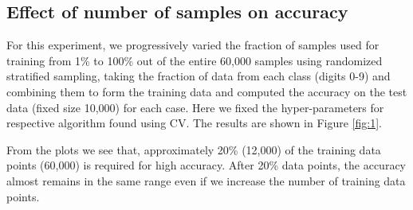 \documentclass[10pt]{scrartcl}
\begin{document}
\subsection*{Effect of number of samples on accuracy}
For this experiment,  we progressively varied the fraction of samples used for training from 1\% to 100\% out of the entire 60,000 samples using randomized stratified sampling, taking the fraction of data from each class (digits 0-9) and combining them to form the training data and computed the accuracy on the test data (fixed size 10,000) for each case. Here we fixed the hyper-parameters for respective algorithm found using CV. The results are shown in Figure \ref{fig:1}.

From the plots we see that, approximately 20\% (12,000) of the training data points (60,000) is required for high accuracy. After 20\% data points, the accuracy almost remains in the same range even if we increase the number of training data points.
\end{document}
